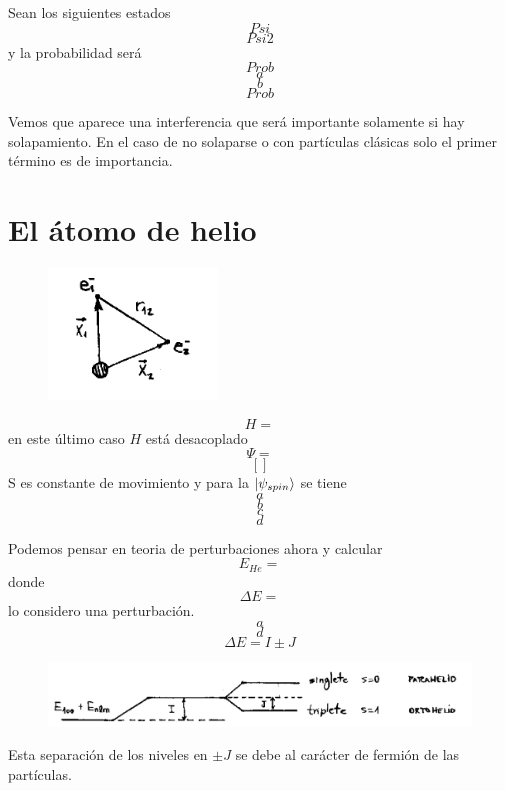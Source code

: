 \documentclass[10pt,oneside]{CBFT_book}
\begin{document}
Sean los siguientes estados 
\[
	Psi
\]
\[
	Psi2
\]
y la probabilidad será
\[
	Prob
\]
\[
	a
\]
\[
	b
\]
\[
	Prob
\]

Vemos que aparece una interferencia que será importante solamente si hay solapamiento. En el caso de no 
solaparse o con partículas clásicas solo el primer término es de importancia.

\section{El átomo de helio}


\begin{figure}[htb]
	\begin{center}
	\includegraphics[width=0.4\textwidth]{images/teo2_30.pdf}
	\end{center}
	\caption{}
\end{figure} 
\[
	H = 
\]
en este último caso $H$ está desacoplado 
\[
	\Psi = 
\]
\[
	[]
\]
S es constante de movimiento y para la $\Ket{\psi_{spin}}$ se tiene 
\[
	a
\]
\[
	b
\]
\[
	c
\]
\[
	d
\]

Podemos pensar en teoria de perturbaciones ahora y calcular 
\[
	E_{He} = 
\]
donde 
\[
	\Delta E = 
\]
lo considero una perturbación.
\[
	a
\]
\[
	d
\]
\[
	\Delta E = I \pm J
\]

\begin{figure}[htb]
	\begin{center}
	\includegraphics[width=1.0\textwidth]{images/teo2_15.pdf}
	\end{center}
	\caption{}
\end{figure} 

Esta separación de los niveles en $\pm J$ se debe al carácter de fermión de las partículas.



\end{document}
